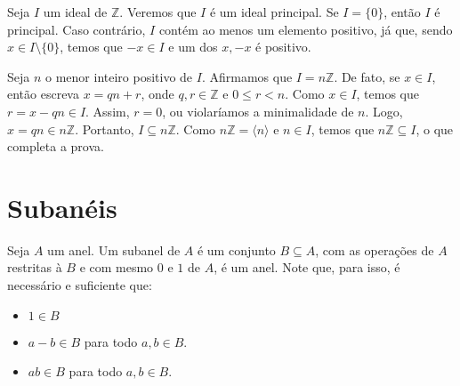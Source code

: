 \begin{prop}
    Seja $I$ um ideal de $\mathbb Z$. Veremos que $I$ é um ideal principal. Se $I=\{0\}$, então $I$ é principal. Caso contrário, $I$ contém ao menos um elemento positivo, já que, sendo $x\in I\setminus\{0\}$, temos que $-x \in I$ e um dos $x, -x$ é positivo.


    Seja $n$ o menor inteiro positivo de $I$. Afirmamos que $I=n\mathbb Z$. De fato, se $x \in I$, então escreva $x=qn+r$, onde $q,r \in \mathbb Z$ e $0\leq r<n$. Como $x \in I$, temos que $r=x-qn \in I$. Assim, $r=0$, ou violaríamos a minimalidade de $n$. Logo, $x=qn\in n\mathbb Z$. Portanto, $I\subseteq n\mathbb Z$. Como $n\mathbb Z=\langle n\rangle$ e $n \in I$, temos que $n\mathbb Z\subseteq I$, o que completa a prova.
\end{prop}
\section{Subanéis}
\begin{definition}[Subanel]
    Seja $A$ um anel. Um subanel de $A$ é um conjunto $B\subseteq A$, com as operações de $A$ restritas à $B$ e com mesmo $0$ e $1$ de $A$, é um anel. Note que, para isso, é necessário e suficiente que:
    
    \begin{itemize}
        \item $1 \in B$
        \item $a-b \in B$ para todo $a, b \in B$.
        \item $ab \in B$ para todo $a, b \in B$.
    \end{itemize}

\end{definition}